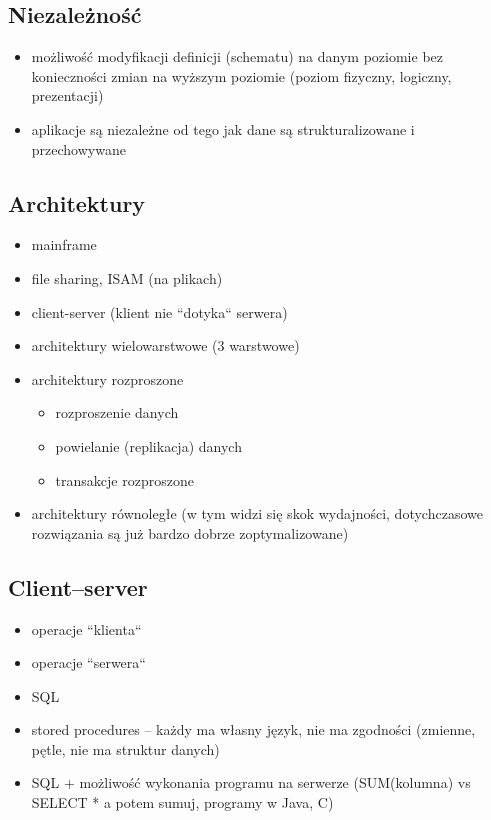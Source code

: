\documentclass[12pt]{article}
\begin{document}
\subsection{Niezależność}
\begin{itemize}
\item możliwość modyfikacji definicji (schematu) na danym poziomie bez konieczności zmian na wyższym poziomie
   (poziom fizyczny, logiczny, prezentacji)
\item aplikacje są niezależne od tego jak dane są strukturalizowane i przechowywane
\end{itemize}

\subsection{Architektury}
\begin{itemize}
\item  mainframe
\item  file sharing, \acs{ISAM} (na plikach)
\item  client-server (klient nie ``dotyka`` serwera)
\item  architektury wielowarstwowe (3 warstwowe)
\item  architektury rozproszone
\begin{itemize}
\item  rozproszenie danych
\item powielanie (replikacja) danych
\item transakcje rozproszone
\end{itemize}
\item  architektury równoległe (w tym widzi się skok wydajności, dotychczasowe rozwiązania są już
   bardzo dobrze zoptymalizowane)
\end{itemize}

\subsection{Client--server}
\begin{itemize}
\item operacje ``klienta``
\item operacje ``serwera``
\item \ac{SQL}
\item stored procedures -- każdy ma własny język, nie ma zgodności (zmienne, pętle, nie ma struktur danych)
\item \ac{SQL} + możliwość wykonania programu na serwerze (SUM(kolumna) vs SELECT * a potem sumuj, programy w Java, C)
\end{itemize}
\end{document}
